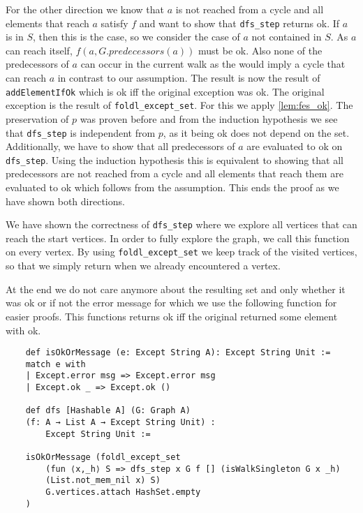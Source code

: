For the other direction we know that $a$ is not reached from a cycle and all elements that reach $a$ satisfy $f$ and want to show that \texttt{dfs\_step} returns ok. If $a$ is in $S$, then this is the case, so we consider the case of $a$ not contained in $S$. As $a$ can reach itself, $f(a, G.predecessors(a))$ must be ok. Also none of the predecessors of $a$ can occur in the current walk as the would imply a cycle that can reach $a$ in contrast to our assumption. The result is now the result of \texttt{addElementIfOk} which is ok iff the original exception was ok. The original exception is the result of \texttt{foldl\_except\_set}. For this we apply \ref{lem:fes_ok}. The preservation of $p$ was proven before and from the induction hypothesis we see that \texttt{dfs\_step} is independent from $p$, as it being ok does not depend on the set. Additionally, we have to show that all predecessors of $a$ are evaluated to ok on \texttt{dfs\_step}. Using the induction hypothesis this is equivalent to showing that all predecessors are not reached from a cycle and all elements that reach them are evaluated to ok which follows from the assumption. This ends the proof as we have shown both directions.

We have shown the correctness of \texttt{dfs\_step} where we explore all vertices that can reach the start vertices. In order to fully explore the graph, we call this function on every vertex. By using \texttt{foldl\_except\_set} we keep track of the visited vertices, so that we simply return when we already encountered a vertex. 

At the end we do not care anymore about the resulting set and only whether it was ok or if not the error message for which we use the following function for easier proofs. This functions returns ok iff the original returned some element with ok.

\begin{lstlisting}
    def isOkOrMessage (e: Except String A): Except String Unit :=
    match e with
    | Except.error msg => Except.error msg
    | Except.ok _ => Except.ok ()

    def dfs [Hashable A] (G: Graph A) 
    (f: A → List A → Except String Unit) :
        Except String Unit :=

    isOkOrMessage (foldl_except_set 
        (fun ⟨x,_h⟩ S => dfs_step x G f [] (isWalkSingleton G x _h) 
        (List.not_mem_nil x) S)
        G.vertices.attach HashSet.empty 
    )
\end{lstlisting}

